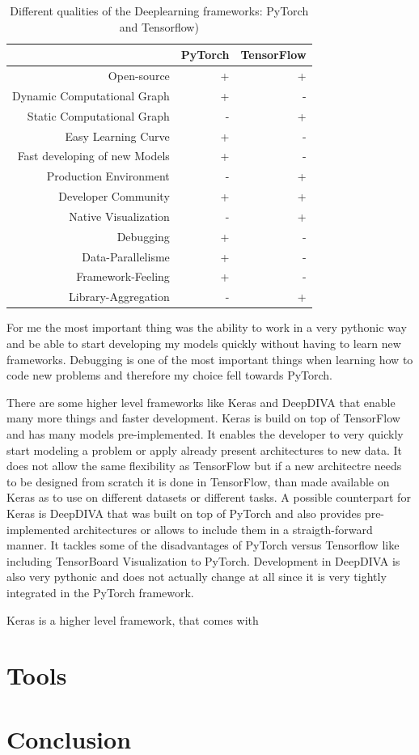 \begin{table}[t] \centering
{}
\caption{Different qualities of the Deeplearning frameworks: PyTorch and Tensorflow)}
\begin{tabular}{@{}rrr@{}}
\toprule & PyTorch & TensorFlow \\
\midrule
Open-source									& + & + \\
Dynamic Computational Graph			& + & -  \\
Static Computational Graph				& - & +  \\
Easy Learning Curve							& + & -  \\
Fast developing of new Models			& + & -  \\
Production Environment					& - & + \\
Developer Community						& + & + \\
Native Visualization							& - & +  \\
Debugging										& + & -  \\
Data-Parallelisme								& + & -  \\
Framework-Feeling							& + & -  \\
Library-Aggregation							& - & +  \\

\bottomrule
\end{tabular}
\label{tbl:DeepLearningFrameworks}
\end{table}


For me the most important thing was the ability to work in a very pythonic way and be able to start developing my models quickly without having to learn new frameworks. Debugging is one of the most important things when learning how to code new problems and therefore my choice fell towards PyTorch.

There are some higher level frameworks like Keras and DeepDIVA that enable many more things and faster development. Keras is build on top of TensorFlow and has many models pre-implemented. It enables the developer to very quickly start modeling a problem or apply already present architectures to new data. It does not allow the same flexibility as TensorFlow but if a new architectre needs to be designed from scratch it is done in TensorFlow, than made available on Keras as to use on different datasets or different tasks. A possible counterpart for Keras is DeepDIVA that was built on top of PyTorch and also provides pre-implemented architectures or allows to include them in a straigth-forward manner. It tackles some of the disadvantages of PyTorch versus Tensorflow like including TensorBoard Visualization to PyTorch. Development in DeepDIVA is also very pythonic and does not actually change at all since it is very tightly integrated in the PyTorch framework.



Keras is a higher level framework, that comes with 

\section{Tools}

\section{Conclusion}